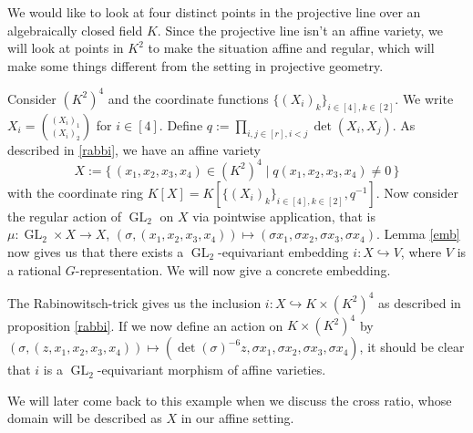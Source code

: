 \begin{dexample}\label{domcr}
  We would like to look at four distinct points in the projective line over an algebraically closed field $K$.
  Since the projective line isn't an affine variety, we will look at points in $K^2$ to make the situation affine and regular, which will make some things different from the setting in projective geometry.
  
  Consider $(K^2)^4$ and the coordinate functions $\{(X_i)_k\}_{i \in [4], k \in [2]}$.
  We write $X_i = \binom{(X_i)_1}{(X_i)_2}$ for $i \in [4]$.
  Define $q := \prod_{i,j \in [r], i<j} \operatorname{det}(X_i,X_j)$.
  As described in \ref{rabbi}, we have an affine variety
  \begin{equation*}
    X := \{\, (x_1,x_2,x_3,x_4) \in (K^2)^4 \mid q(x_1,x_2,x_3,x_4) \neq 0 \,\}
  \end{equation*}
  with the coordinate ring $K[X] = K[\{(X_i)_k\}_{i \in [4], k \in [2]},q^{-1}]$.
  Now consider the regular action of $\operatorname{GL}_2$ on $X$ via pointwise application, that is $\mu \colon \operatorname{GL}_2 \times X \rightarrow X$, $(\sigma,(x_1,x_2,x_3,x_4)) \mapsto (\sigma x_1,\sigma x_2,\sigma x_3,\sigma x_4)$.
  Lemma \ref{emb} now gives us that there exists a $\operatorname{GL}_2$-equivariant embedding $i \colon X \hookrightarrow V$, where $V$ is a rational $G$-representation.
  We will now give a concrete embedding.
  
  The Rabinowitsch-trick gives us the inclusion $i \colon X \hookrightarrow K \times (K^2)^4$ as described in proposition \ref{rabbi}.
  If we now define an action on $K \times (K^2)^4$ by \linebreak$(\sigma,(z,x_1,x_2,x_3,x_4)) \mapsto (\operatorname{det}(\sigma)^{-6}z,\sigma x_1,\sigma x_2,\sigma x_3,\sigma x_4)$, it should be clear that $i$ is a $\operatorname{GL}_2$-equivariant morphism of affine varieties.
  
  We will later come back to this example when we discuss the cross ratio, whose domain will be described as $X$ in our affine setting.
\end{dexample}

